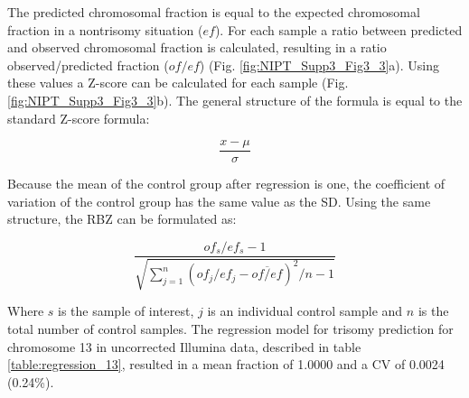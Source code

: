 \noindent The predicted chromosomal fraction is equal to the expected chromosomal fraction in a nontrisomy situation ($ef$). For each sample a ratio between predicted and observed chromosomal fraction is calculated, resulting in a ratio observed/predicted fraction ($of/ef$) (Fig. \ref{fig:NIPT_Supp3_Fig3_3}a).
Using these values a Z-score can be calculated for each sample (Fig. \ref{fig:NIPT_Supp3_Fig3_3}b). The general structure of the formula is equal to the standard Z-score formula:

\begin{equation*}
\frac{x - \mu}{\sigma}
\end{equation*}

\noindent Because the mean of the control group after regression is one, the coefficient of variation of the control group has the same value as the SD. Using the same structure, the RBZ can be formulated as:

\begin{equation*}
\frac{of_s / ef_s - 1}{\sqrt{\sum^n_{j=1}(of_j / ef_j - \overline{of/ef})^2 / n - 1}}
\end{equation*}

\noindent Where $s$ is the sample of interest, $j$ is an individual control sample and $n$ is the total number of control samples. 
The regression model for trisomy prediction for chromosome 13 in uncorrected Illumina data, described in table \ref{table:regression_13}, resulted in a mean fraction of 1.0000 and a CV of 0.0024 (0.24\%).


